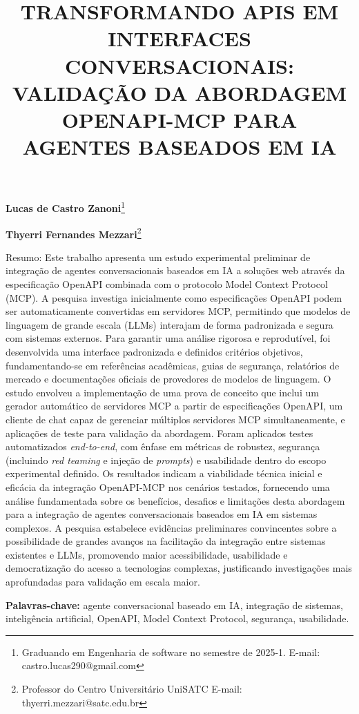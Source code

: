 \documentclass[
]{article}
\title{\textbf{TRANSFORMANDO APIS EM INTERFACES CONVERSACIONAIS:
VALIDAÇÃO DA ABORDAGEM OPENAPI-MCP PARA AGENTES BASEADOS EM IA}}
\author{}
\date{}
\begin{document}
\maketitle

\textbf{Lucas de Castro Zanoni}\footnote{Graduando em Engenharia de
  software no semestre de 2025-1. E-mail: castro.lucas290@gmail.com}

\textbf{Thyerri Fernandes Mezzari}\footnote{Professor do Centro
  Universitário UniSATC E-mail: thyerri.mezzari@satc.edu.br}

Resumo: Este trabalho apresenta um estudo experimental preliminar de
integração de agentes conversacionais baseados em IA a soluções web
através da especificação OpenAPI combinada com o protocolo Model Context
Protocol (MCP). A pesquisa investiga inicialmente como especificações
OpenAPI podem ser automaticamente convertidas em servidores MCP,
permitindo que modelos de linguagem de grande escala (LLMs) interajam de
forma padronizada e segura com sistemas externos. Para garantir uma
análise rigorosa e reprodutível, foi desenvolvida uma interface
padronizada e definidos critérios objetivos, fundamentando-se em
referências acadêmicas, guias de segurança, relatórios de mercado e
documentações oficiais de provedores de modelos de linguagem. O estudo
envolveu a implementação de uma prova de conceito que inclui um gerador
automático de servidores MCP a partir de especificações OpenAPI, um
cliente de chat capaz de gerenciar múltiplos servidores MCP
simultaneamente, e aplicações de teste para validação da abordagem.
Foram aplicados testes automatizados \emph{end-to-end}, com ênfase em
métricas de robustez, segurança (incluindo \emph{red teaming} e injeção
de \emph{prompts}) e usabilidade dentro do escopo experimental definido.
Os resultados indicam a viabilidade técnica inicial e eficácia da
integração OpenAPI-MCP nos cenários testados, fornecendo uma análise
fundamentada sobre os benefícios, desafios e limitações desta abordagem
para a integração de agentes conversacionais baseados em IA em sistemas
complexos. A pesquisa estabelece evidências preliminares convincentes
sobre a possibilidade de grandes avanços na facilitação da integração
entre sistemas existentes e LLMs, promovendo maior acessibilidade,
usabilidade e democratização do acesso a tecnologias complexas,
justificando investigações mais aprofundadas para validação em escala
maior.

\textbf{Palavras-chave:} agente conversacional baseado em IA, integração
de sistemas, inteligência artificial, OpenAPI, Model Context Protocol,
segurança, usabilidade.
\end{document}
